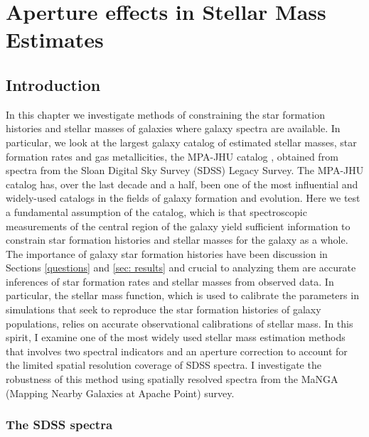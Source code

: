 \chapter{Aperture effects in Stellar Mass Estimates}

\label{ch:acm}
\newpage

\section{Introduction}

In this chapter we investigate methods of constraining the star formation histories and stellar masses of galaxies where galaxy spectra are available. In particular, we look at the largest galaxy catalog of estimated stellar masses, star formation rates and gas metallicities, the MPA-JHU catalog \citep{brinchmann_physical_2004, kauffmann_stellar_2003, tremonti_origin_2004}, obtained from spectra from the Sloan Digital Sky Survey (SDSS) Legacy Survey. The MPA-JHU catalog has, over the last decade and a half, been one of the most influential and widely-used catalogs in the fields of galaxy formation and evolution. Here we test a fundamental assumption of the catalog, which is that spectroscopic measurements of the central region of the galaxy yield sufficient information to constrain star formation histories and stellar masses for the galaxy as a whole.\\

The importance of galaxy star formation histories have been discussion in Sections \ref{questions} and  \ref{sec: results} and crucial to analyzing them are accurate inferences of star formation rates and stellar masses from observed data. In particular, the stellar mass function, which is used to calibrate the parameters in simulations that seek to reproduce the star formation histories of galaxy populations, relies on accurate observational calibrations of stellar mass. In this spirit, I examine one of the most widely used stellar mass estimation methods that involves two spectral indicators and an aperture correction to account for the limited spatial resolution coverage of SDSS spectra. I investigate the robustness of this method using spatially resolved spectra from the MaNGA (Mapping Nearby Galaxies at Apache Point) survey.\\

\subsection{The SDSS spectra}
\label{sdss spectra}

